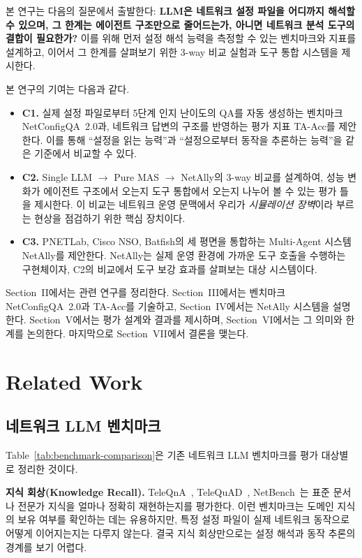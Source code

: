 \documentclass[journal]{IEEEtran}
\begin{document}
본 연구는 다음의 질문에서 출발한다: \textbf{LLM은 네트워크 설정 파일을 어디까지 해석할 수 있으며, 그 한계는 에이전트 구조만으로 줄어드는가, 아니면 네트워크 분석 도구의 결합이 필요한가?} 이를 위해 먼저 설정 해석 능력을 측정할 수 있는 벤치마크와 지표를 설계하고, 이어서 그 한계를 살펴보기 위한 3-way 비교 실험과 도구 통합 시스템을 제시한다.

본 연구의 기여는 다음과 같다.
\begin{itemize}
  \item \textbf{C1.} 실제 설정 파일로부터 5단계 인지 난이도의 QA를 자동 생성하는 벤치마크 NetConfigQA~2.0과, 네트워크 답변의 구조를 반영하는 평가 지표 TA-Acc를 제안한다. 이를 통해 ``설정을 읽는 능력''과 ``설정으로부터 동작을 추론하는 능력''을 같은 기준에서 비교할 수 있다.
  \item \textbf{C2.} Single LLM $\rightarrow$ Pure MAS $\rightarrow$ NetAlly의 3-way 비교를 설계하여, 성능 변화가 에이전트 구조에서 오는지 도구 통합에서 오는지 나누어 볼 수 있는 평가 틀을 제시한다. 이 비교는 네트워크 운영 문맥에서 우리가 \emph{시뮬레이션 장벽}이라 부르는 현상을 점검하기 위한 핵심 장치이다.
  \item \textbf{C3.} PNETLab, Cisco NSO, Batfish의 세 평면을 통합하는 Multi-Agent 시스템 NetAlly를 제안한다. NetAlly는 실제 운영 환경에 가까운 도구 호출을 수행하는 구현체이자, C2의 비교에서 도구 보강 효과를 살펴보는 대상 시스템이다.
\end{itemize}

Section~II에서는 관련 연구를 정리한다. Section~III에서는 벤치마크 NetConfigQA~2.0과 TA-Acc를 기술하고, Section~IV에서는 NetAlly 시스템을 설명한다. Section~V에서는 평가 설계와 결과를 제시하며, Section~VI에서는 그 의미와 한계를 논의한다. 마지막으로 Section~VII에서 결론을 맺는다.

\section{Related Work}
\subsection{네트워크 LLM 벤치마크}

Table~\ref{tab:benchmark-comparison}은 기존 네트워크 LLM 벤치마크를 평가 대상별로 정리한 것이다.

\textbf{지식 회상(Knowledge Recall).} TeleQnA~\cite{ref9}, TeleQuAD~\cite{ref10}, NetBench~\cite{ref11}는 표준 문서나 전문가 지식을 얼마나 정확히 재현하는지를 평가한다. 이런 벤치마크는 도메인 지식의 보유 여부를 확인하는 데는 유용하지만, 특정 설정 파일이 실제 네트워크 동작으로 어떻게 이어지는지는 다루지 않는다. 결국 지식 회상만으로는 설정 해석과 동작 추론의 경계를 보기 어렵다.
\end{document}
